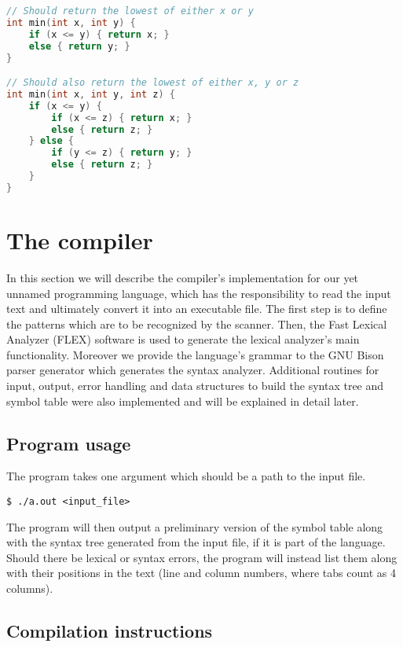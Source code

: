 \documentclass[12pt]{article}
\begin{document}
\begin{lstlisting}[language=C]
// Should return the lowest of either x or y
int min(int x, int y) {
	if (x <= y) { return x; }
	else { return y; }
}

// Should also return the lowest of either x, y or z
int min(int x, int y, int z) {
	if (x <= y) {
		if (x <= z) { return x; }
		else { return z; }
	} else {
		if (y <= z) { return y; }
		else { return z; }
	}
}
\end{lstlisting}




\clearpage

\section{The compiler}
In this section we will describe the compiler's implementation for our yet unnamed programming
language, which has the responsibility to read the input text and ultimately convert it into an
executable file. The first step is to define the patterns which are to be recognized by the scanner.
Then, the Fast Lexical Analyzer (FLEX) \cite{FLEX} software is used to generate the lexical
analyzer's main functionality. Moreover we provide the language's grammar to the GNU Bison parser
generator \cite{BISON} which generates the syntax analyzer. Additional routines for input, output,
error handling and data structures to build the syntax tree and symbol table were also implemented
and will be explained in detail later.


\subsection{Program usage}
The program takes one argument which should be a path to the input file.

\begin{lstlisting}
$ ./a.out <input_file>
\end{lstlisting}

The program will then output a preliminary version of the symbol table along with the syntax tree
generated from the input file, if it is part of the language.
Should there be lexical or syntax errors, the program will instead list them along with their
positions in the text (line and column numbers, where tabs count as 4 columns).

\subsection{Compilation instructions}
\end{document}
